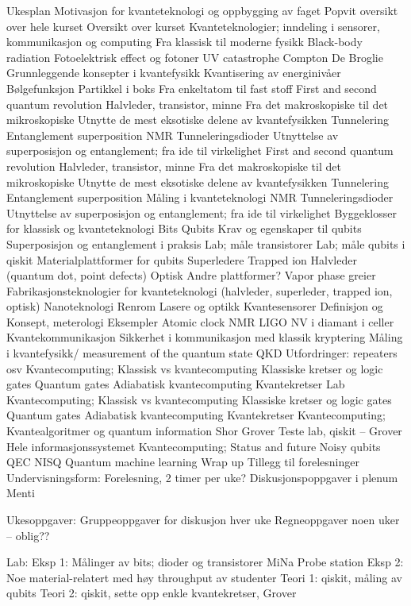 \documentclass[%
oneside,                 %
final,                   %
10pt]{article}
\begin{document}
Ukesplan 
Motivasjon for kvanteteknologi og oppbygging av faget 
Popvit oversikt over hele kurset 
Oversikt over kurset 
Kvanteteknologier; inndeling i sensorer, kommunikasjon og computing 
Fra klassisk til moderne fysikk
Black-body radiation
Fotoelektrisk effect og fotoner
UV catastrophe 
Compton
De Broglie 
Grunnleggende konsepter i kvantefysikk 
Kvantisering av energinivåer 
Bølgefunksjon 
Partikkel i boks 
Fra enkeltatom til fast stoff  
First and second quantum revolution 
Halvleder, transistor, minne 
Fra det makroskopiske til det mikroskopiske 
Utnytte de mest eksotiske delene av kvantefysikken 
Tunnelering 
Entanglement 
superposition  
NMR 
Tunneleringsdioder 
Utnyttelse av superposisjon og entanglement; fra ide til virkelighet 
First and second quantum revolution 
Halvleder, transistor, minne 
Fra det makroskopiske til det mikroskopiske 
Utnytte de mest eksotiske delene av kvantefysikken 
Tunnelering 
Entanglement 
superposition  
Måling i kvanteteknologi 
NMR 
Tunneleringsdioder 
Utnyttelse av superposisjon og entanglement; fra ide til virkelighet 
Byggeklosser for klassisk og kvanteteknologi 
Bits
Qubits 
Krav og egenskaper til qubits 
Superposisjon og entanglement i praksis 
Lab; måle transistorer 
Lab; måle qubits i qiskit 
Materialplattformer for qubits 
Superledere 
Trapped ion 
Halvleder (quantum dot, point defects) 
Optisk 
Andre plattformer? Vapor phase greier 
Fabrikasjonsteknologier for kvanteteknologi (halvleder, superleder, trapped ion, optisk) 
Nanoteknologi 
Renrom 
Lasere og optikk 
Kvantesensorer
Definisjon og Konsept, meterologi 
Eksempler 
Atomic clock 
NMR 
LIGO 
NV i diamant i celler  
Kvantekommunikasjon 
Sikkerhet i kommunikasjon med klassik kryptering 
Måling i kvantefysikk/ measurement of the quantum state   
QKD 
Utfordringer: repeaters osv 
Kvantecomputing; Klassisk vs kvantecomputing 
Klassiske kretser og logic gates 
Quantum gates 
Adiabatisk kvantecomputing 
Kvantekretser
Lab 
Kvantecomputing; Klassisk vs kvantecomputing 
Klassiske kretser og logic gates 
Quantum gates 
Adiabatisk kvantecomputing 
Kvantekretser
Kvantecomputing; Kvantealgoritmer og quantum information 
Shor 
Grover
Teste lab, qiskit – Grover 
Hele informasjonssystemet 
Kvantecomputing; Status and future  
Noisy qubits 
QEC 
NISQ 
Quantum machine learning 
Wrap up 
Tillegg til forelesninger 
Undervisningsform: 
Forelesning, 2 timer per uke?  
Diskusjonspoppgaver i plenum 
Menti 

Ukesoppgaver: 
Gruppeoppgaver for diskusjon hver uke 
Regneoppgaver noen uker – oblig?? 

Lab:
Eksp 1: Målinger av bits; dioder og transistorer 
MiNa 
Probe station 
Eksp 2: Noe material-relatert med høy throughput av studenter 
Teori 1: qiskit, måling av qubits
Teori 2: qiskit, sette opp enkle kvantekretser, Grover 
\end{document}
